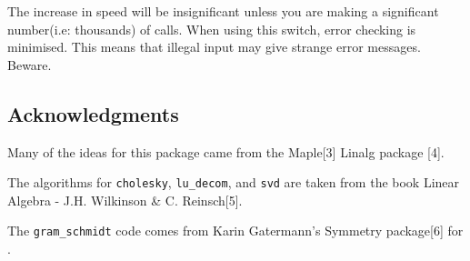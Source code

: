 The increase in speed will be insignificant unless you are making a
significant number(i.e: thousands) of calls. When using this switch,
error checking is minimised. This means that illegal input may give
strange error messages. Beware.


\subsection{Acknowledgments}

Many of the ideas for this package came from the Maple[3] Linalg package
[4].

The algorithms for \texttt{cholesky}, \texttt{lu\_decom}, and \texttt{svd} are
taken from the book Linear Algebra - J.H. Wilkinson \& C. Reinsch[5].

The \texttt{gram\_schmidt} code comes from Karin Gatermann's Symmetry
package[6] for {\REDUCE}.
